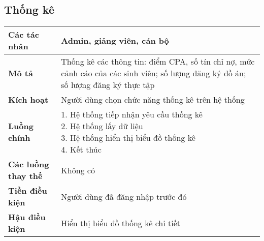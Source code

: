 \subsection*{Thống kê}
	\begin{tabular}{|l|p{}|}
		\hline
		\textbf{Các tác nhân}         & Admin, giảng viên, cán bộ                                                                                           \\
		\hline
		\textbf{Mô tả}                & Thống kê các thông tin: điểm CPA, số tín chỉ nợ, mức cảnh cáo của các sinh viên; số lượng đăng ký đồ án; số lượng đăng ký thực tập \\
		\hline
		\textbf{Kích hoạt}            & Người dùng chọn chức năng thống kê trên hệ thống                                                                                   \\
		\hline
		\textbf{Luồng chính}           & \makecell[l]{1. Hệ thống tiếp nhận yêu cầu thống kê                                                                                \\ 2. Hệ thống lấy dữ liệu \\ 3. Hệ thống hiển thị biểu đồ thống kê \\ 4. Kết thúc} \\
		\hline
		\textbf{Các luồng thay thế}   & Không có                                                                                                                           \\
		\hline
		\textbf{Tiền điều kiện}       & Người dùng đã đăng nhập trước đó                                                                                                   \\
		\hline
		\textbf{Hậu điều kiện}        & Hiển thị biểu đồ thống kê chi tiết                                                                                                 \\
		\hline
	\end{tabular}
